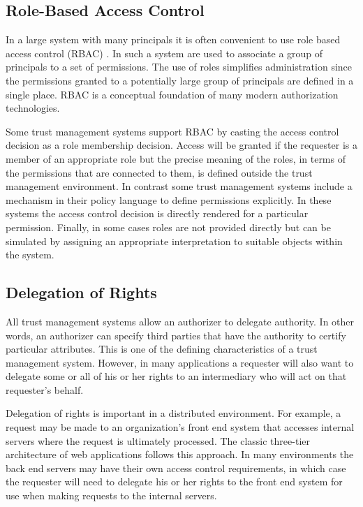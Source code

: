 \subsection{Role-Based Access Control}

In a large system with many principals it is often convenient to use role based access control
(RBAC) \cite{Ferraiolo:RBAC,Sandhu:RBACM}. In such a system  are used to
associate a group of principals to a set of permissions. The use of roles simplifies
administration since the permissions granted to a potentially large group of principals are
defined in a single place. RBAC is a conceptual foundation of many modern authorization
technologies.

Some trust management systems support RBAC by casting the access control decision as a role
membership decision. Access will be granted if the requester is a member of an appropriate role
but the precise meaning of the roles, in terms of the permissions that are connected to them, is
defined outside the trust management environment. In contrast some trust management systems
include a mechanism in their policy language to define permissions explicitly. In these systems
the access control decision is directly rendered for a particular permission. Finally, in some
cases roles are not provided directly but can be simulated by assigning an appropriate
interpretation to suitable objects within the system.

\subsection{Delegation of Rights}

All trust management systems allow an authorizer to delegate authority. In other words, an
authorizer can specify third parties that have the authority to certify particular attributes. 
This is one of the defining characteristics of a trust management system. However, in many
applications a requester will also want to delegate some or all of his or her rights to an
intermediary who will act on that requester's behalf.

Delegation of rights is important in a distributed environment. For example, a request may be
made to an organization's front end system that accesses internal servers where the request is
ultimately processed. The classic three-tier architecture of web applications follows this
approach. In many environments the back end servers may have their own access control
requirements, in which case the requester will need to delegate his or her rights to the front
end system for use when making requests to the internal servers.

